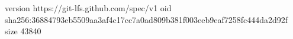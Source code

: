 version https://git-lfs.github.com/spec/v1
oid sha256:36884793eb5509aa3af4c17cc7a0ad809b381f003eeb9eaf7258fc444da2d92f
size 43840
